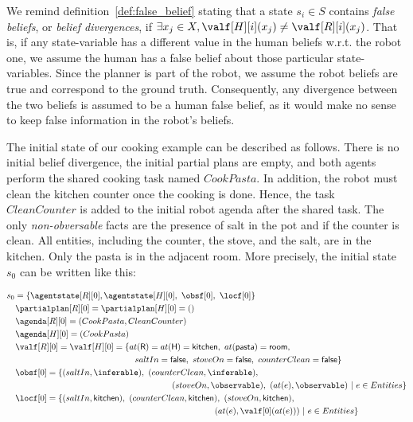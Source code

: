 We remind definition~\ref{def:false_belief} stating that a state $s_i \in S$ contains \textit{false beliefs}, or \textit{belief divergences}, if $\exists x_j \in X, \valf[H][i](x_j) \neq \valf[R][i](x_j)$. That is, if any state-variable has a different value in the human beliefs w.r.t. the robot one, we assume the human has a false belief about those particular state-variables. Since the planner is part of the robot, we assume the robot beliefs are true and correspond to the ground truth. Consequently, any divergence between the two beliefs is assumed to be a human false belief, as it would make no sense to keep false information in the robot's beliefs. 

The initial state of our cooking example can be described as follows. There is no initial belief divergence, the initial partial plans are empty, and both agents perform the shared cooking task named $CookPasta$. In addition, the robot must clean the kitchen counter once the cooking is done. Hence, the task $CleanCounter$ is added to the initial robot agenda after the shared task. The only \textit{non-obversable} facts are the presence of salt in the pot and if the counter is clean. All entities, including the counter, the stove, and the salt, are in the kitchen. Only the pasta is in the adjacent room. More precisely, the initial state $s_0$ can be written like this: 


{\small
\noindent
\begin{align*}
&s_0 = \{\agentstate[R][0], \agentstate[H][0],~\obsf[0],~\locf[0]\} \\
&\quad \partialplan[R][0] = \partialplan[H][0] = ()\\
&\quad \agenda[R][0] = (CookPasta, CleanCounter)\\
&\quad \agenda[H][0] = (CookPasta)\\
&\quad \valf[R][0] = \valf[H][0] = \{at(\textsf{R}) = at(\textsf{H}) = \textsf{kitchen},~at(\textsf{pasta})=\textsf{room},\\
&\qquad \qquad \qquad \qquad \qquad \qquad \qquad \quad saltIn = \textsf{false},~stoveOn = \textsf{false},~counterClean = \textsf{false}\}\\
&\quad \obsf[0] = \{ (saltIn,\inferable),~(counterClean,\inferable),\\
&\qquad \qquad \qquad \qquad \qquad \qquad \qquad \qquad \qquad \quad \ (stoveOn,\observable),~(at(e),\observable) ~|~ e \in Entities\}\\
&\quad \locf[0] = \{ (saltIn,\textsf{kitchen}),~(counterClean,\textsf{kitchen}),~(stoveOn,\textsf{kitchen}),\\
&\qquad \qquad \qquad \qquad \qquad \qquad \qquad \qquad \qquad \qquad \qquad \qquad \ (at(e),\valf[0](at(e))) ~|~ e \in Entities \}
\end{align*}}

